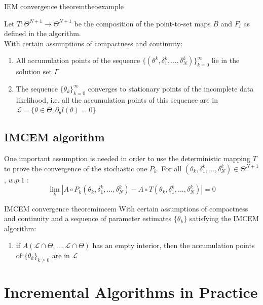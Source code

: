 \documentclass[a0,portrait]{a0poster}
\begin{document}
\begin{multicols}{2}
\begin{mytheo}{IEM convergence theorem}{theoexample}

Let $T: \Theta^{N+1} \to \Theta^{N+1}$ be the composition of the point-to-set maps $B$ and $F_{i}$ as defined in the algorithm.\\
With certain assumptions of compactness and continuity:
\begin{enumerate}
\item All accumulation points of the sequence $\{(\theta^k, \delta_1^k,\dots, \delta_N^k)\}_{k=0}^{\infty}$ lie in the solution set $\Gamma$
\item The sequence $\{\theta_k\}_{k=0}^{\infty}$ converges to stationary points of the incomplete data likelihood, i.e. all the accumulation points of this sequence are in  $\mathcal{L} = \{\theta \in \Theta, \partial_{\theta}l(\theta) = 0 \}$
\end{enumerate}

\end{mytheo}



\subsection{IMCEM algorithm}
One important assumption is needed in order to use the deterministic mapping $T$ to prove the convergence of the stochastic one $P_{k}$. For all $(\theta_k, \delta_1^k,\dots,\delta_N^k) \in \Theta^{N+1}$, $w.p.1$ :
\begin{equation*}
\lim\limits_{k} |A \circ P_{k}(\theta_k, \delta_1^k,\dots,\delta_N^k) - A \circ T(\theta_k, \delta_1^k,\dots,\delta_N^k)| = 0
\end{equation*}

 \begin{mytheo}{IMCEM convergence theorem}{imcem}
With certain assumptions of compactness and continuity and a sequence of parameter estimates $\{\theta_{k}\}$ satisfying the IMCEM algorithm:
\begin{enumerate}
  \item if $A(\mathcal{L}\cap\Theta,\dots,\mathcal{L}\cap\Theta)$ has an empty interior, then the accumulation points of $\{\theta_{k}\}_{k \geq 0}$ are in $\mathcal{L}$
\end{enumerate}
\end{mytheo}
   
   
   
\section{Incremental Algorithms in Practice}

\end{multicols}
\end{document}
